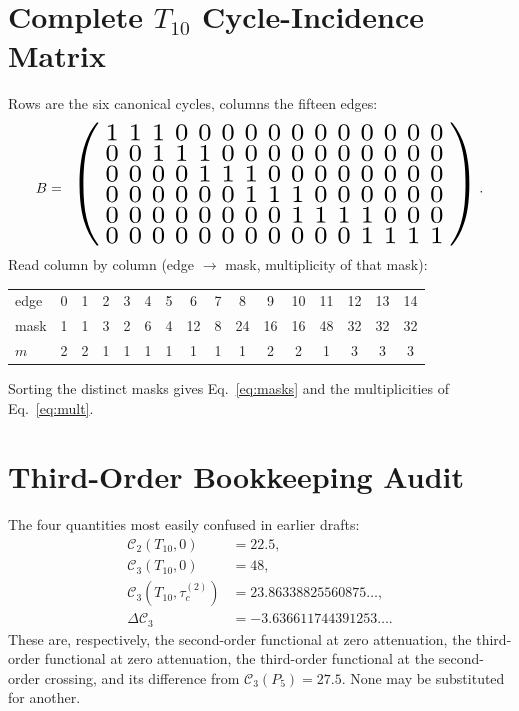 \documentclass[10pt,twocolumn]{article}
\theoremstyle{definition}
\newcommand{\Tten}{T_{10}}
\newcommand{\Pfive}{P_5}
\newcommand{\tauc}{\tau_c^{(2)}}
\begin{document}
\section{Complete $\Tten$ Cycle-Incidence Matrix}
Rows are the six canonical cycles, columns the fifteen edges:
\begin{equation*}
B=\;\resizebox{0.85\columnwidth}{!}{$\left(\begin{smallmatrix}
1&1&1&0&0&0&0&0&0&0&0&0&0&0&0\\
0&0&1&1&1&0&0&0&0&0&0&0&0&0&0\\
0&0&0&0&1&1&1&0&0&0&0&0&0&0&0\\
0&0&0&0&0&0&1&1&1&0&0&0&0&0&0\\
0&0&0&0&0&0&0&0&1&1&1&1&0&0&0\\
0&0&0&0&0&0&0&0&0&0&0&1&1&1&1
\end{smallmatrix}\right)$}.
\end{equation*}
Read column by column (edge $\to$ mask, multiplicity of that mask):
\begin{center}\footnotesize
\setlength{\tabcolsep}{2.5pt}
\begin{tabular}{@{}l*{15}{c}@{}}
edge&0&1&2&3&4&5&6&7&8&9&10&11&12&13&14\\
mask&1&1&3&2&6&4&12&8&24&16&16&48&32&32&32\\
$m$&2&2&1&1&1&1&1&1&1&2&2&1&3&3&3\\
\end{tabular}
\end{center}
Sorting the distinct masks gives Eq.~\eqref{eq:masks} and the multiplicities of Eq.~\eqref{eq:mult}.

\section{Third-Order Bookkeeping Audit}
The four quantities most easily confused in earlier drafts:
\begin{align}
\mathcal C_2(\Tten,0)&=22.5,\\
\mathcal C_3(\Tten,0)&=48,\\
\mathcal C_3(\Tten,\tauc)&=23.86338825560875\ldots,\\
\Delta\mathcal C_3&=-3.636611744391253\ldots.
\end{align}
These are, respectively, the second-order functional at zero attenuation, the third-order functional at zero attenuation, the third-order functional at the second-order crossing, and its difference from $\mathcal C_3(\Pfive)=27.5$. None may be substituted for another.
\end{document}
